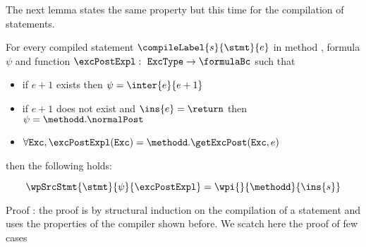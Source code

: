 The next lemma states the same property but this time for the compilation of statements.
\begin{thm}\label{relWpStmt}
     For every compiled statement $\compileLabel{s}{\stmt}{e}$  in  method \methodd, formula $\psi$ and 
    function $\excPostExpl : \mbox{ \rm \texttt{ExcType}}  \rightarrow \formulaBc $ such that 

      \begin{itemize}
            \item if $e+1$ exists  then $\psi = \inter{e}{e+1}$
	    \item if $e+1$ does not exist and $\ins{e} = \return$ then $\psi = \methodd. \normalPost$
	    \item $\forall \mbox{\rm\texttt{Exc}} ,  \excPostExpl( \mbox{\rm\texttt{Exc}} ) = \methodd.\getExcPost(\mbox{\rm\texttt{Exc}}, e ) $ 
      \end{itemize} then the following holds: 
  
     $$   \wpSrcStmt{\stmt}{\psi }{\excPostExpl} = \wpi{}{\methodd}{\ins{s}}$$   
\end{thm}

Proof : the proof is  by structural induction on the compilation of a statement and uses the properties of the compiler 
        shown before. We scatch here the proof of few cases 


